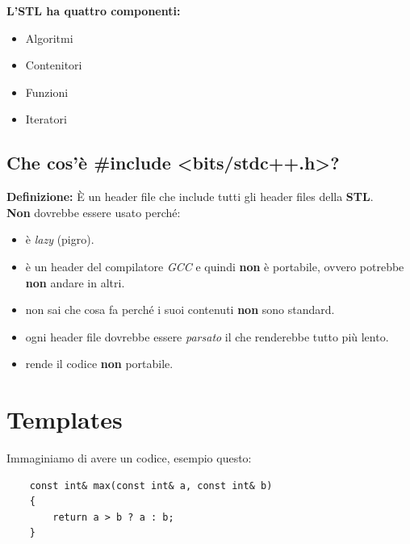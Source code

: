 \textsf{\small \textbf{L'STL ha quattro componenti: } } \\

\begin{itemize}
	\item \textsf{\small Algoritmi}
	\item \textsf{\small Contenitori}
	\item \textsf{\small Funzioni}
	\item \textsf{\small Iteratori}
\end{itemize}

\subsection{Che cos'è \#include <bits/stdc++.h>?}

\textsf{\small \textbf{Definizione: } È un header file che include tutti gli header files della \textbf{STL}.} \\

\textsf{\small \textbf{Non} dovrebbe essere usato perché: } \\

\begin{itemize}
	\item \textsf{\small è \emph{lazy} (pigro).}
	\item \textsf{\small è un header del compilatore \emph{GCC} e quindi \textbf{non} è portabile, ovvero potrebbe \textbf{non} andare in altri.}
	\item \textsf{\small non sai che cosa fa perché i suoi contenuti \textbf{non} sono standard.}
	\item \textsf{\small ogni header file dovrebbe essere \emph{parsato} il che renderebbe tutto più lento.}
	\item \textsf{\small rende il codice \textbf{non} portabile.}
\end{itemize}


\newpage

\section{Templates}

\textsf{\small Immaginiamo di avere un codice, esempio questo:} \\

\begin{lstlisting}
	const int& max(const int& a, const int& b)
	{
		return a > b ? a : b;
	}
\end{lstlisting}


